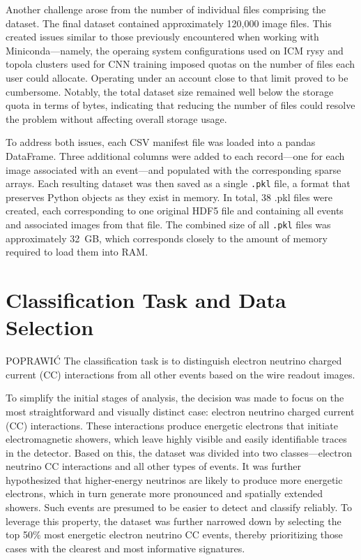 \documentclass{pracalicmgr}
\begin{document}
Another challenge arose from the number of individual files comprising the dataset. The final dataset contained approximately 120,000 image files. This created issues similar to those previously encountered when working with Miniconda—namely, the operaing system configurations used on ICM rysy and topola clusters used for CNN training imposed quotas on the number of files each user could allocate. Operating under an account close to that limit proved to be cumbersome. Notably, the total dataset size remained well below the storage quota in terms of bytes, indicating that reducing the number of files could resolve the problem without affecting overall storage usage.

To address both issues, each CSV manifest file was loaded into a pandas DataFrame. Three additional columns were added to each record—one for each image associated with an event—and populated with the corresponding sparse arrays. Each resulting dataset was then saved as a single \texttt{.pkl} file, a format that preserves Python objects as they exist in memory. In total, 38 .pkl files were created, each corresponding to one original HDF5 file and containing all events and associated images from that file. The combined size of all \texttt{.pkl} files was approximately 32~GB, which corresponds closely to the amount of memory required to load them into RAM.

\section{Classification Task and Data Selection}


POPRAWIĆ
The classification task is to distinguish electron neutrino charged current (CC) interactions from all other events based on the wire readout images.

To simplify the initial stages of analysis, the decision was made to focus on the most straightforward and visually distinct case: electron neutrino charged current (CC) interactions. These interactions produce energetic electrons that initiate electromagnetic showers, which leave highly visible and easily identifiable traces in the detector. Based on this, the dataset was divided into two classes—electron neutrino CC interactions and all other types of events. It was further hypothesized that higher-energy neutrinos are likely to produce more energetic electrons, which in turn generate more pronounced and spatially extended showers. Such events are presumed to be easier to detect and classify reliably. To leverage this property, the dataset was further narrowed down by selecting the top 50\% most energetic electron neutrino CC events, thereby prioritizing those cases with the clearest and most informative signatures.
\end{document}
